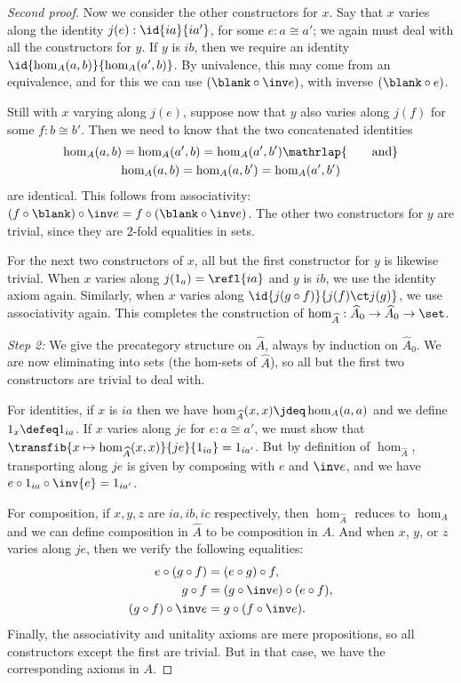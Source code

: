 \begin{proof}[Second proof]
  Now we consider the other constructors for $x$.
  Say that $x$ varies along the identity $j(e):\id{ia}{ia'}$, for some $e:a \cong a'$; we again must deal with all the constructors for $y$.
  If $y$ is $ib$, then we require an identity $\id{\hom_A(a,b)}{\hom_A(a',b)}$.
  By univalence, this may come from an equivalence, and for this we can use $(\blank\circ \inv e)$, with inverse $(\blank\circ e)$.

  Still with $x$ varying along $j(e)$, suppose now that $y$ also varies along $j(f)$ for some $f:b\cong b'$.
  Then we need to know that the two concatenated identities
  \begin{gather*}
    \hom_A(a,b) = \hom_A(a',b) = \hom_A(a',b') \mathrlap{\qquad\text{and}}\\
    \hom_A(a,b) = \hom_A(a,b') = \hom_A(a',b')
  \end{gather*}
  are identical.
  This follows from associativity: $(f\circ \blank)\circ \inv e = f\circ (\blank\circ \inv e)$.
  The other two constructors for $y$ are trivial, since they are 2-fold equalities in sets.

  For the next two constructors of $x$, all but the first constructor for $y$ is likewise trivial.
  When $x$ varies along $j(1_a)=\refl{ia}$ and $y$ is $ib$, we use the identity axiom again.
  Similarly, when $x$ varies along $\id{j(g\circ f)}{j(f)\ct j(g)}$, we use associativity again.
  This completes the construction of $\hom_{\widehat A}:\widehat A_0 \to \widehat A_0 \to \set$.

  \mentalpause

  \emph{Step 2:} We give the precategory structure on $\widehat A$, always by induction on $\widehat A_0$.
  We are now eliminating into sets (the hom-sets of $\widehat A$), so all but the first two constructors are trivial to deal with.

  For identities, if $x$ is $ia$ then we have $\hom_{\widehat A}(x,x) \jdeq \hom_A(a,a)$ and we define $1_x \defeq 1_{ia}$.
  If $x$ varies along $je$ for $e:a\cong a'$, we must show that $\transfib{x\mapsto \hom_{\widehat A}(x,x)}{je}{1_{ia}} = 1_{ia'}$.
  But by definition of $\hom_{\widehat A}$, transporting along $je$ is given by composing with $e$ and $\inv e$, and we have $e\circ 1_{ia} \circ \inv{e} = 1_{ia'}$.

  For composition, if $x,y,z$ are $ia,ib,ic$ respectively, then $\hom_{\widehat A}$ reduces to $\hom_A$ and we can define composition in $\widehat A$ to be composition in $A$.
  And when $x$, $y$, or $z$ varies along $je$, then we verify the following equalities:
  \begin{align*}
    e \circ (g\circ f) &= (e\circ g) \circ f,\\
    g\circ f &= (g\circ \inv e) \circ (e\circ f),\\
    (g\circ f) \circ \inv e &= g \circ (f\circ \inv e).
  \end{align*}
  Finally, the associativity and unitality axioms are mere propositions, so all constructors except the first are trivial.
  But in that case, we have the corresponding axioms in $A$.


\end{proof}
